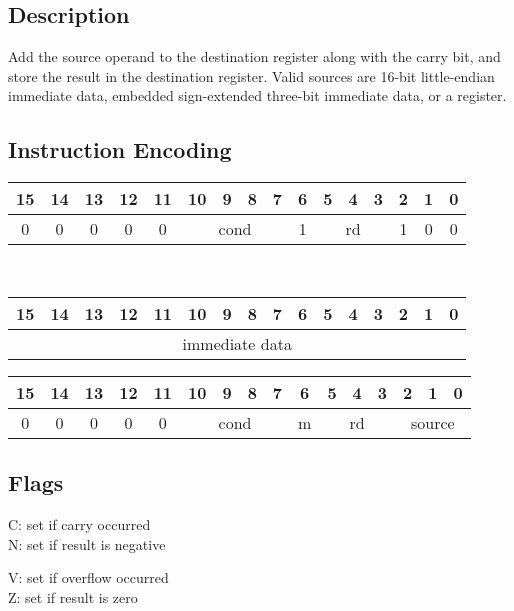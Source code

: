 \documentclass[11pt]{book}
\newcommand*{\encoding}[1]{\noindent
\begin{tabular}{|c|c|c|c|c|c|c|c|c|c|c|c|c|c|c|c|}
\multicolumn{1}{c}{15}&
\multicolumn{1}{c}{14}&
\multicolumn{1}{c}{13}&
\multicolumn{1}{c}{12}&
\multicolumn{1}{c}{11}&
\multicolumn{1}{c}{10}&
\multicolumn{1}{c}{9}&
\multicolumn{1}{c}{8}&
\multicolumn{1}{c}{7}&
\multicolumn{1}{c}{6}&
\multicolumn{1}{c}{5}&
\multicolumn{1}{c}{4}&
\multicolumn{1}{c}{3}&
\multicolumn{1}{c}{2}&
\multicolumn{1}{c}{1}&
\multicolumn{1}{c}{0}\\\hline
#1\\\hline
\end{tabular}}
\begin{document}
\subsection*{Description}
Add the source operand to the destination register
along with the carry bit,
and store the result in the destination register.
Valid sources are 16-bit little-endian immediate data,
embedded sign-extended three-bit immediate data,
or a register.

\subsection*{Instruction Encoding}
\encoding{0&0&0&0&0%
&\multicolumn{4}{|c|}{cond}%
&1&\multicolumn{3}{|c|}{rd}&1&0&0}\\\null\qquad
\encoding{\multicolumn{16}{|c|}{immediate data}}

\vspace{2\baselineskip}
\encoding{0&0&0&0&0%
&\multicolumn{4}{|c|}{cond}%
&m&\multicolumn{3}{|c|}{rd}&\multicolumn{3}{|c|}{source}}

\subsection*{Flags}
\begin{multicols}{2}\noindent
  C: set if carry occurred\\
  N: set if result is negative

  \columnbreak\noindent
  V: set if overflow occurred\\
  Z: set if result is zero
\end{multicols}
\end{document}
